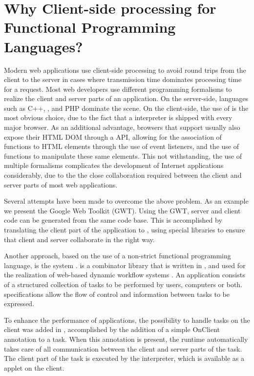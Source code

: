 \section{Why Client-side processing for Functional Programming Languages?}
\label{sapljs:sec:motivation}
Modern web applications use client-side processing to avoid round trips from the
client to the server in cases where transmission time dominates processing time 
for a request. Most web developers use different programming formalisms to
realize the client and server parts of an application. On the server-side,
languages such as \textsf{C++}, \Java, and \textsf{PHP} dominate the scene.
On the client-side, the use of \JS is the most obvious choice, due to the fact
that a \JS interpreter is shipped with every major browser. As an additional
advantage, browsers that support \JS usually also expose their \textsf{HTML}
\textsf{DOM} through a \JS API, allowing for the association of \JS functions to
\textsf{HTML} elements through the use of event listeners, and the use of \JS
functions to manipulate these same elements. This not withstanding, the use of
multiple formalisms complicates the development of Internet applications
considerably, due to the the close collaboration required between the client and
server parts of most web applications.

Several attempts have been made to overcome the above problem. As an example we
present the Google Web Toolkit (\textsf{GWT}). Using the GWT, server and client
code can be generated from the same \Java code base. This is accomplished
by translating the client part of the application to \JS, using special
libraries to ensure that client and server collaborate in the right way.

Another approach, based on the use of a non-strict functional programming
language, is the \iTask system \cite{ITASK}. \iTask is a combinator library
that is written in \Clean, and used for the realization of web-based dynamic
workflow systems \cite{LDTA2010}. An \iTask application consists of a structured
collection of tasks to be performed by users, computers or both. \iTask
specifications allow the flow of control and information between tasks to be
expressed. 

To enhance the performance of \iTask applications, the possibility to handle
tasks on the client was added in \cite{ITASK_AJAX}, accomplished by the
addition of a simple \textsf{OnClient} annotation to a task. When this
annotation is present, the \iTask runtime automatically takes care of all
communication between the client and server parts of the task. The client part
of the task is executed by the \Sapl interpreter, which is available as a \Java 
applet on the client.

